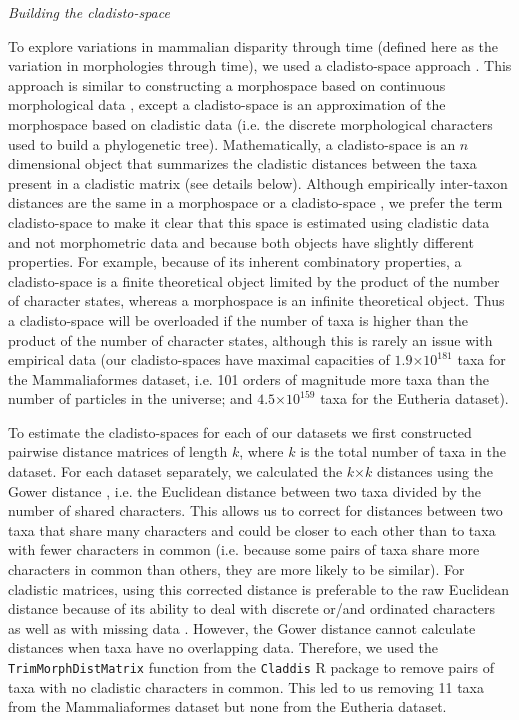 \documentclass[12pt,letterpaper]{article}
\renewcommand{\subsection}[1]{%
\bigskip
\begin{center}
\begin{large}
\normalfont\itshape #1
\end{large}
\end{center}}
\begin{document}
\subsection{Building the cladisto-space}
To explore variations in mammalian disparity through time (defined here as the variation in morphologies through time), we used a cladisto-space approach \citep[e.g.][]{Foote01071994,Foote29111996,Wesley-Hunt2005,Brusatte12092008,friedmanexplosive2010,toljagictriassic-jurassic2013,Hughes20082013}.
This approach is similar to constructing a morphospace based on continuous morphological data \citep[e.g.][]{friedmanexplosive2010}, except a cladisto-space is an approximation of the morphospace based on cladistic data (i.e. the discrete morphological characters used to build a phylogenetic tree).
Mathematically, a cladisto-space is an $n$ dimensional object that summarizes the cladistic distances between the taxa present in a cladistic matrix (see details below).
Although empirically inter-taxon distances are the same in a morphospace or a cladisto-space \citep{foth2012different,hetherington2015cladistic}, we prefer the term cladisto-space to make it clear that this space is estimated using cladistic data and not morphometric data and because both objects have slightly different properties.
For example, because of its inherent combinatory properties, a cladisto-space is a finite theoretical object limited by the product of the number of character states, whereas a morphospace is an infinite theoretical object.
Thus a cladisto-space will be overloaded if the number of taxa is higher than the product of the number of character states, although this is rarely an issue with empirical data (our cladisto-spaces have maximal capacities of $1.9$$\times$$10^{181}$ taxa for the Mammaliaformes dataset, i.e. 101 orders of magnitude more taxa than the number of particles in the universe; and $4.5$$\times$$10^{159}$ taxa for the Eutheria dataset).

To estimate the cladisto-spaces for each of our datasets we first constructed pairwise distance matrices of length $k$, where $k$ is the total number of taxa in the dataset. 
For each dataset separately, we calculated the $k$$\times$$k$ distances using the Gower distance \citep{Gower71}, i.e. the Euclidean distance between two taxa divided by the number of shared characters. 
This allows us to correct for distances between two taxa that share many characters and could be closer to each other than to taxa with fewer characters in common (i.e. because some pairs of taxa share more characters in common than others, they are more likely to be similar).
For cladistic matrices, using this corrected distance is preferable to the raw Euclidean distance because of its ability to deal with discrete or/and ordinated characters as well as with missing data \citep{anderson2012using}.
However, the Gower distance cannot calculate distances when taxa have no overlapping data.
Therefore, we used the \texttt{TrimMorphDistMatrix} function from the \texttt{Claddis} R package \citep{Claddis} to remove pairs of taxa with no cladistic characters in common.
This led to us removing 11 taxa from the Mammaliaformes dataset but none from the Eutheria dataset.
\end{document}
